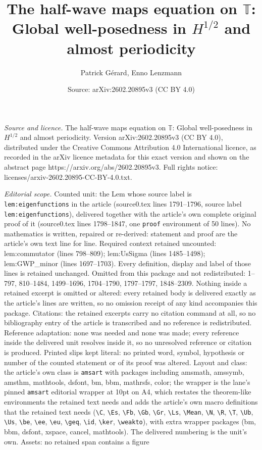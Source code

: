 \documentclass[10pt,a4paper]{amsart}
\title[The half-wave maps equation on $\mathbb{T}$: Global well-pos]{The half-wave maps equation on $\mathbb{T}$: Global well-posedness in $H^{1/2}$ and almost periodicity}
\author{Patrick G\'erard, Enno Lenzmann}
\date{Source: arXiv:2602.20895v3 (CC BY 4.0)}
\begin{document}
\maketitle

\noindent\emph{Source and licence.} The half-wave maps equation on $\mathbb{T}$: Global well-posedness in $H^{1/2}$ and almost periodicity. Version arXiv:2602.20895v3 (CC BY 4.0), distributed under the Creative Commons Attribution 4.0 International licence, as recorded in the arXiv licence metadata for this exact version and shown on the abstract page https://arxiv.org/abs/2602.20895v3. Full rights notice: licenses/arxiv-2602.20895-CC-BY-4.0.txt.\par\smallskip

\noindent\textit{Editorial scope.} Counted unit: the Lem whose source label is \texttt{lem:eigenfunctions} in the article (source0.tex lines 1791--1796, source label \texttt{lem:eigenfunctions}), delivered together with the article's own complete original proof of it (source0.tex lines 1798--1847, one \texttt{proof} environment of 50 lines). No mathematics is written, repaired or re-derived: statement and proof are the article's own text line for line. Required context retained uncounted: lem:commutator (lines 798--809); lem:UsSigma (lines 1485--1498); lem:GWP\_minor (lines 1697--1703). Every definition, display and label of those lines is retained unchanged. Omitted from this package and not redistributed: 1--797, 810--1484, 1499--1696, 1704--1790, 1797--1797, 1848--2309. Nothing inside a retained excerpt is omitted or altered: every retained body is delivered exactly as the article's lines are written, so no omission receipt of any kind accompanies this package. Citations: the retained excerpts carry no citation command at all, so no bibliography entry of the article is transcribed and no reference is redistributed. Reference adaptation: none was needed and none was made; every reference inside the delivered unit resolves inside it, so no unresolved reference or citation is produced. Printed slips kept literal: no printed word, symbol, hypothesis or number of the counted statement or of its proof was altered. Layout and class: the article's own class is \texttt{amsart} with packages including amsmath, amssymb, amsthm, mathtools, dsfont, bm, bbm, mathrsfs, color; the wrapper is the lane's pinned \texttt{amsart} editorial wrapper at 10pt on A4, which restates the theorem-like environments the retained text needs and adds the article's own macro definitions that the retained text needs (\texttt{\textbackslash C}, \texttt{\textbackslash Es}, \texttt{\textbackslash Fb}, \texttt{\textbackslash Gb}, \texttt{\textbackslash Gr}, \texttt{\textbackslash Ls}, \texttt{\textbackslash Mean}, \texttt{\textbackslash N}, \texttt{\textbackslash R}, \texttt{\textbackslash T}, \texttt{\textbackslash Ub}, \texttt{\textbackslash Us}, \texttt{\textbackslash be}, \texttt{\textbackslash ee}, \texttt{\textbackslash eu}, \texttt{\textbackslash geq}, \texttt{\textbackslash id}, \texttt{\textbackslash ker}, \texttt{\textbackslash weakto}), with extra wrapper packages (bm, bbm, dsfont, xspace, cancel, mathtools). The delivered numbering is the unit's own. Assets: no retained span contains a figure 
\end{document}
